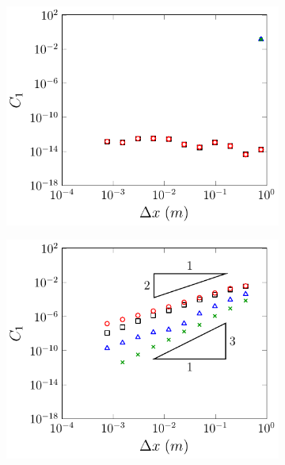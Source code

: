 \begin{figure}
	\centering
	\begin{subfigure}{0.5\textwidth}
		\includegraphics[width=\textwidth]{./chp5/figures/Analytic/LakeAtRest/C1/FEVMWB.pdf}
		\vspace{0.5cm}
	\end{subfigure}%
	\begin{subfigure}{0.5\textwidth}
		\includegraphics[width=\textwidth]{./chp5/figures/Analytic/LakeAtRest/C1/FEVMnWB.pdf}
		\vspace{0.5cm}

\end{subfigure}
\end{figure}
